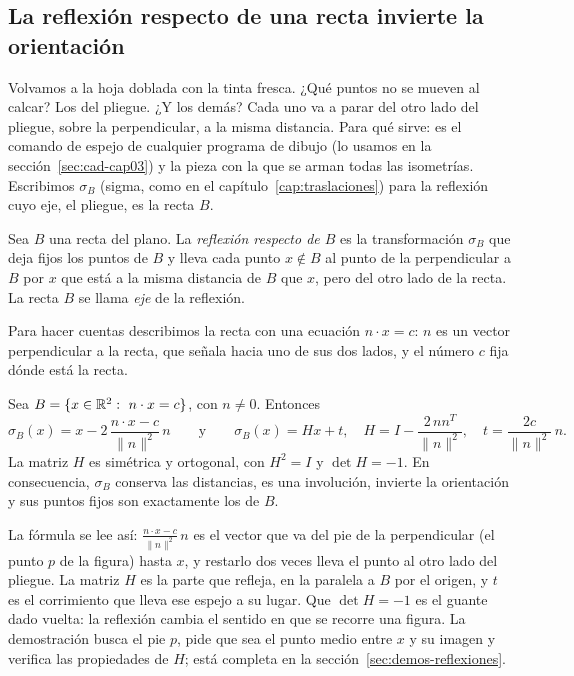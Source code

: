 \subsection{La reflexión respecto de una recta invierte la orientación}\label{sec:refl-recta}

Volvamos a la hoja doblada con la tinta fresca. ¿Qué puntos no se mueven al calcar? Los del
pliegue. ¿Y los demás? Cada uno va a parar del otro lado del pliegue, sobre la perpendicular, a
la misma distancia. Para qué sirve: es el comando de espejo de cualquier programa de dibujo (lo
usamos en la sección~\ref{sec:cad-cap03}) y la pieza con la que se arman todas las isometrías.
Escribimos \(\sigma_{B}\) (sigma, como en el capítulo~\ref{cap:traslaciones}) para la reflexión cuyo eje, el pliegue, es la recta \(B\).

\begin{definicion}\label{def:reflexion-recta}
Sea \(B\) una recta del plano. La \emph{reflexión respecto de \(B\)} es la transformación
\(\sigma_{B}\) que deja fijos los puntos de \(B\) y lleva cada punto \(x\notin B\) al punto de la
perpendicular a \(B\) por \(x\) que está a la misma distancia de \(B\) que \(x\), pero del otro
lado de la recta. La recta \(B\) se llama \emph{eje} de la reflexión.
\end{definicion}

Para hacer cuentas describimos la recta con una ecuación \(n\cdot x=c\): \(n\) es un vector
perpendicular a la recta, que señala hacia uno de sus dos lados, y el número \(c\) fija dónde
está la recta.

\begin{proposicion}\label{prop:reflexion-recta}
Sea \(B=\{x\in\mathbb{R}^2:\ n\cdot x=c\}\), con \(n\neq0\). Entonces
\[
  \boxed{\sigma_{B}(x)=x-2\,\frac{n\cdot x-c}{\lVert n\rVert^2}\,n}
  \qquad\text{y}\qquad
  \sigma_{B}(x)=Hx+t,\quad
  H=I-\frac{2\,nn^T}{\lVert n\rVert^2},\quad
  t=\frac{2c}{\lVert n\rVert^2}\,n .
\]
La matriz \(H\) es simétrica y ortogonal, con \(H^2=I\) y \(\det H=-1\). En consecuencia,
\(\sigma_{B}\) conserva las distancias, es una involución, invierte la orientación y sus puntos
fijos son exactamente los de \(B\).
\end{proposicion}

La fórmula se lee así: \(\frac{n\cdot x-c}{\lVert n\rVert^2}\,n\) es el vector que va del pie
de la perpendicular (el punto \(p\) de la figura) hasta \(x\), y restarlo dos veces lleva el
punto al otro lado del pliegue. La matriz \(H\) es la parte que refleja, en la paralela a \(B\)
por el origen, y \(t\) es el corrimiento que lleva ese espejo a su lugar. Que \(\det H=-1\) es
el guante dado vuelta: la reflexión cambia el sentido en que se recorre una figura. La
demostración busca el pie \(p\), pide que sea el punto medio entre \(x\) y su imagen y verifica
las propiedades de \(H\); está completa en la sección~\ref{sec:demos-reflexiones}.

